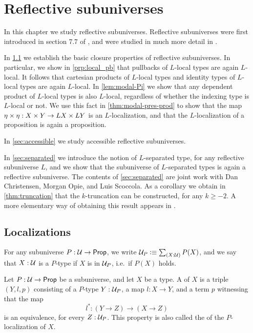 \chapter{Reflective subuniverses}

In this chapter we study reflective subuniverses. Reflective subuniverses were first introduced in section 7.7 of \cite{hottbook}, and were studied in much more detail in \cite{RijkeShulmanSpitters}. 

In \cref{sec:prop-rfsu} we establish the basic closure properties of reflective subuniverses. In particular, we show in \cref{prp:local_pb} that pullbacks of $L$-local types are again $L$-local. It follows that cartesian products of $L$-local types and identity types of $L$-local types are again $L$-local. In \cref{lem:modal-Pi} we show that any dependent product of $L$-local types is also $L$-local, regardless of whether the indexing type is $L$-local or not. We use this fact in \cref{thm:modal-pres-prod} to show that the map ${\eta_{}}\times{\eta_{}}:X\times Y\to LX\times LY$ is an $L$-localization, and that the $L$-localization of a proposition is again a proposition.

In \cref{sec:accessible} we study accessible reflective subuniverses.

In \cref{sec:separated} we introduce the notion of $L$-separated type, for any reflective subuniverse $L$, and we show that the subuniverse of $L$-separated types is again a reflective subuniverse. The contents of \cref{sec:separated} are joint work with Dan Christensen, Morgan Opie, and Luis Scoccola. As a corollary we obtain in \cref{thm:truncation} that the $k$-truncation can be constructed, for any $k\geq -2$. A more elementary way of obtaining this result appears in \cite{joinconstruction}.

\section{Localizations}
\label{sec:prop-rfsu}

For any subuniverse $P:\mathcal{U}\to\mathsf{Prop}$, we write $\UU_P\defeq \sm{X:\UU}P(X)$, and we say that $X:\mathcal{U}$ is a $P$-type if $X$ is in $\mathcal{U}_P$, i.e.~if $P(X)$ holds.

\begin{defn}
Let $P:\mathcal{U}\to\mathsf{Prop}$ be a subuniverse, and let $X$ be a type. A  of $X$ is a triple $(Y,l,p)$ consisting of a $P$-type $Y:\mathcal{U}_P$, a map $l:X\to Y$, and a term $p$ witnessing that the map
\begin{equation*}
l^\ast : (Y\to Z)\to (X\to Z)
\end{equation*}
is an equivalence, for every $Z:\mathcal{U}_P$. This property is also called the  of the $P$-localization of $X$.
\end{defn}


